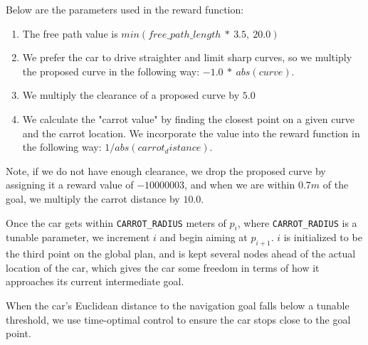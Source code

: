 Below are the parameters used in the reward function:
\begin{enumerate}
\label{rewardparam}
	\item The free path value is $min(free\_path\_length~*~3.5,~20.0)$
	\item We prefer the car to drive straighter and limit sharp curves, so we multiply the proposed curve in the following way: $-1.0~*~abs(curve)$.
	\item We multiply the clearance of a proposed curve by $5.0$	
	\item We calculate the "carrot value" by finding the closest point on a given curve and the carrot location. We incorporate the value into the reward function in the following way: $1/abs(carrot_distance)$. 
\end{enumerate}

Note, if we do not have enough clearance, we drop the proposed curve by assigning it a reward value of $-10000003$, and when we are within $0.7m$ of the goal, we multiply the carrot distance by $10.0$.  

Once the car gets within {\tt CARROT\_RADIUS} meters of $p_i$, where {\tt CARROT\_RADIUS} is a tunable parameter, we increment $i$ and begin aiming at $p_{i+1}$. $i$ is initialized to be the third point on the global plan, and is kept several nodes ahead of the actual location of the car, which gives the car some freedom in terms of how it approaches its current intermediate goal. 

When the car's Euclidean distance to the navigation goal falls below a tunable threshold, we use time-optimal control to ensure the car stops close to the goal point.

